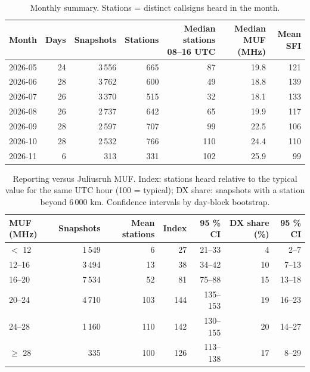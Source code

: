 \begin{table}[htbp]\centering\small
\caption{Monthly summary. Stations = distinct callsigns heard in the month.}\label{tab:months}
\begin{tabular}{lrrrrrr}
\toprule
Month & Days & Snapshots & Stations & Median stations 08--16 UTC & Median MUF (MHz) & Mean SFI \\
\midrule
2026-05 & 24 & 3\,556 & 665 & 87 & 19.8 & 121 \\
2026-06 & 28 & 3\,762 & 600 & 49 & 18.8 & 139 \\
2026-07 & 26 & 3\,370 & 515 & 32 & 18.1 & 133 \\
2026-08 & 26 & 2\,737 & 642 & 65 & 19.9 & 117 \\
2026-09 & 28 & 2\,597 & 707 & 99 & 22.5 & 106 \\
2026-10 & 28 & 2\,532 & 766 & 110 & 24.4 & 110 \\
2026-11 & 6 & 313 & 331 & 102 & 25.9 & 99 \\
\bottomrule
\end{tabular}
\end{table}

\begin{table}[htbp]\centering\small
\caption{Reporting versus Juliusruh MUF. Index: stations heard relative to the typical value for the same UTC hour (100 = typical); DX share: snapshots with a station beyond 6\,000 km. Confidence intervals by day-block bootstrap.}\label{tab:muf}
\begin{tabular}{lrrrrrr}
\toprule
MUF (MHz) & Snapshots & Mean stations & Index & 95 \% CI & DX share (\%) & 95 \% CI \\
\midrule
$<$ 12 & 1\,549 & 6 & 27 & 21--33 & 4 & 2--7 \\
12--16 & 3\,494 & 13 & 38 & 34--42 & 10 & 7--13 \\
16--20 & 7\,534 & 52 & 81 & 75--88 & 15 & 13--18 \\
20--24 & 4\,710 & 103 & 144 & 135--153 & 19 & 16--23 \\
24--28 & 1\,160 & 110 & 142 & 130--155 & 20 & 14--27 \\
$\geq$ 28 & 335 & 100 & 126 & 113--138 & 17 & 8--29 \\
\bottomrule
\end{tabular}
\end{table}

